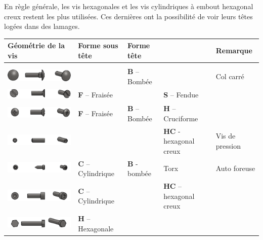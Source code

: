 \documentclass[11pt,oneside]{article}
\begin{document}
En règle générale, les vis hexagonales et les vis cylindriques à embout hexagonal creux restent les plus utilisées. Ces dernières ont la possibilité de voir leurs têtes logées dans des lamages.
\begin{center}
\begin{tabular}{|m{7cm}|m{2.5cm}|m{2cm}|m{2.5cm}|m{2.5cm}|}
\hline
\textbf{Géométrie de la vis} & \textbf{Forme sous tête}  & \textbf{Forme tête} & & \textbf{Remarque}\\
\hline \hline
&&&& \\
\includegraphics[width=6.5cm]{png/vis_1} &  & \textbf{B} -- Bombée & & Col carré\\
\hline
\includegraphics[width=6.5cm]{png/vis_2} &  \textbf{F} -- Fraisée &  & \textbf{S} -- Fendue& \\
\hline
\includegraphics[width=6.5cm]{png/vis_3} & \textbf{F} -- Fraisée & \textbf{B} -- Bombée & \textbf{H} -- Cruciforme& \\
\hline
\includegraphics[width=6.5cm]{png/vis_4} & & & \textbf{HC} - hexagonal creux & Vis de pression\\
\hline
\includegraphics[width=6.5cm]{png/vis_5} & \textbf{C} -- Cylindrique & \textbf{B} - bombée & Torx & Auto foreuse \\
\hline
\includegraphics[width=6.5cm]{png/vis_6} & \textbf{C} -- Cylindrique & & \textbf{HC} -- hexagonal creux & \\
\hline
\includegraphics[width=6.5cm]{png/vis_7} & \textbf{H} -- Hexagonale & & & \\
\hline
\end{tabular}
\end{center}
\end{document}
